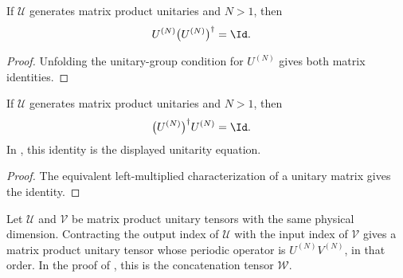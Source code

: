 \begin{lemma}
    \label{lem:mpu_mul_adjoint}
    \leanok
    If $\mathcal U$ generates matrix product unitaries and $N>1$, then
    \begin{align}
        U^{(N)}\bigl(U^{(N)}\bigr)^\dagger & = \Id.
    \end{align}
\end{lemma}

\begin{proof}\leanok
    Unfolding the unitary-group condition for $U^{(N)}$ gives both matrix identities.
\end{proof}

\begin{lemma}
    \label{lem:mpu_adjoint_mul}
    \leanok
    If $\mathcal U$ generates matrix product unitaries and $N>1$, then
    \begin{align}
        \bigl(U^{(N)}\bigr)^\dagger U^{(N)} & = \Id.
    \end{align}
    In \cite[Section~III, equation~(12)]{Cirac2017MPU}, this identity is the displayed unitarity
    equation.
\end{lemma}

\begin{proof}\leanok
    The equivalent left-multiplied characterization of a unitary matrix gives the identity.
\end{proof}

\begin{lemma}
    \label{thm:mpu_composition}
    \leanok
    Let $\mathcal U$ and $\mathcal V$ be matrix product unitary tensors with the
    same physical dimension.  Contracting the output index of $\mathcal U$
    with the input index of $\mathcal V$ gives a matrix product unitary tensor
    whose periodic operator is $U^{(N)}V^{(N)}$, in that order.  In the proof of \cite[Theorem~IV.6(ii)]{Cirac2017MPU}, this is the
    concatenation tensor
    $\mathcal W$.
\end{lemma}

